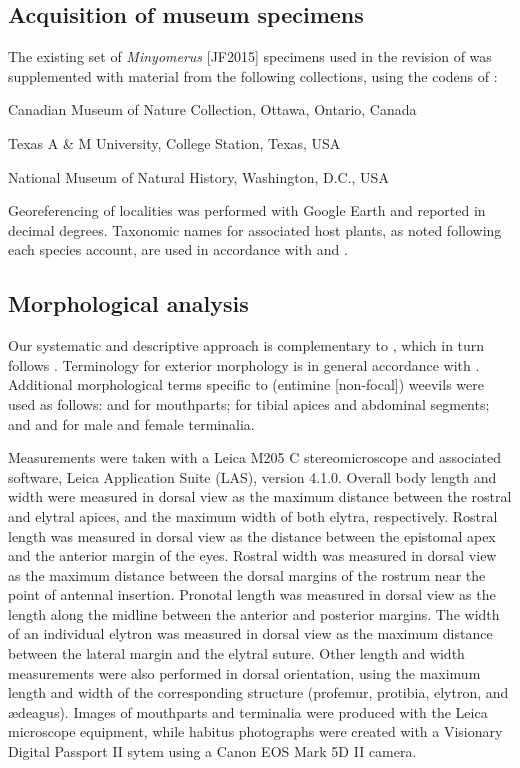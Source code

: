 \documentclass[fleqn,10pt,lineno]{wlpeerj} %
\begin{document}
	\subsection*{Acquisition of museum specimens} 
		The existing set of \textit{Minyomerus} [JF2015] specimens used in the revision of \citet{jansen2015} was supplemented with material from the following collections, using the codens of \citet{arnett1993}:
		
		\begin{description}[itemsep=-1ex]
			\item[\texttt{CMNC}] Canadian Museum of Nature Collection, Ottawa, Ontario, Canada
			\item[\texttt{TAMU}] Texas A \& M University, College Station, Texas, USA
			\item[\texttt{USNM}] National Museum of Natural History, Washington, D.C., USA
		\end{description}

			Georeferencing of localities was performed with Google Earth \citep{google2018} and reported in decimal degrees.
		Taxonomic names for associated host plants, as noted following each species account, are used in accordance with \citet{munz1973} and \citet{seinet2018}.
		
	\subsection*{Morphological analysis}
		Our systematic and descriptive approach is complementary to \citet{jansen2015}, which in turn follows \citet{franz2010a, franz2010b, franz2012}.
		Terminology for exterior morphology is in general accordance with \citet{torre1989}.
		Additional morphological terms specific to (entimine [non-focal]) weevils were used as follows:
			\citet{ting1936} and \citet{morimoto2003} for mouthparts;
			\citet{thompson1992} for tibial apices and abdominal segments;
			and \citet{oberprieler2014} and \citet{howden1995} for male and female terminalia.
		
		Measurements were taken with a Leica M205 C stereomicroscope and associated software, Leica Application Suite (LAS), version 4.1.0.
		Overall body length and width were measured in dorsal view as the maximum distance between the rostral and elytral apices, and the maximum width of both elytra, respectively.
		Rostral length was measured in dorsal view as the distance between the epistomal apex and the anterior margin of the eyes.
		Rostral width was measured in dorsal view as the maximum distance between the dorsal margins of the rostrum near the point of antennal insertion.
		Pronotal length was measured in dorsal view as the length along the midline between the anterior and posterior margins.
		The width of an individual elytron was measured in dorsal view as the maximum distance between the lateral margin and the elytral suture.
		Other length and width measurements were also performed in dorsal orientation, using the maximum length and width of the corresponding structure (profemur, protibia, elytron, and {\ae}deagus).
		Images of mouthparts and terminalia were produced with the Leica microscope equipment, while habitus photographs were created with a Visionary Digital Passport II sytem using a Canon EOS Mark 5D II camera.
\end{document}
